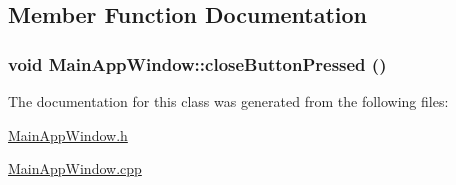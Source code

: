 \subsection{Member Function Documentation}
\hypertarget{class_main_app_window_96799c0426d41f555f1b9745144b4092}{
\subsubsection[{closeButtonPressed}]{\setlength{\rightskip}{0pt plus 5cm}void MainAppWindow::closeButtonPressed ()}}
\label{class_main_app_window_96799c0426d41f555f1b9745144b4092}




The documentation for this class was generated from the following files:\begin{CompactItemize}
\item 
\hyperlink{_main_app_window_8h}{MainAppWindow.h}\item 
\hyperlink{_main_app_window_8cpp}{MainAppWindow.cpp}\end{CompactItemize}
